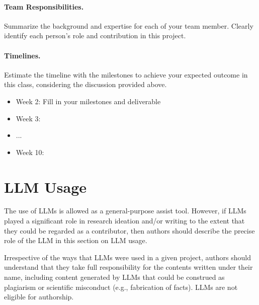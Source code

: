 \documentclass{article}
\begin{document}
\paragraph{Team Responsibilities.}
Summarize the background and expertise for each of your team member. Clearly identify each person's role and contribution in this project.

\paragraph{Timelines.}
Estimate the timeline with the milestones to achieve your expected outcome in this class, considering the discussion provided above.
\begin{itemize}
    \item Week 2: Fill in your milestones and deliverable
    \item Week 3:
    \item ...
    \item Week 10:
\end{itemize}


\section*{LLM Usage}
The use of LLMs is allowed as a general-purpose assist tool. However,  if LLMs played a significant role in research ideation and/or writing to the extent that they could be regarded as a contributor, then authors should describe the precise role of the LLM in this section on LLM usage.

Irrespective of the ways that LLMs were used in a given project, authors should understand that they take full responsibility for the contents written under their name, including content generated by LLMs that could be construed as plagiarism or scientific misconduct (e.g., fabrication of facts).  LLMs are not eligible for authorship.




%
%
\end{document}

